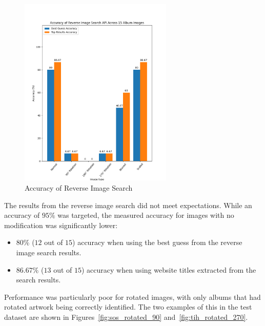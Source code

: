 \begin{figure} [H]
    \centering
    \includegraphics[width=0.65\textwidth]{figures/evaluation_graphs_ris.png}
    \caption{Accuracy of Reverse Image Search}
    \label{fig:album-scanning-results-ris}
\end{figure}

The results from the reverse image search did not meet expectations. While an accuracy of $95\%$ was targeted, the measured accuracy for images with no modification was significantly lower:
\begin{itemize}
    \item $80\%$ ($12$ out of $15$) accuracy when using the best guess from the reverse image search results.
    \item $86.67\%$ ($13$ out of $15$) accuracy when using website titles extracted from the search results.
\end{itemize}

Performance was particularly poor for rotated images, with only albums that had rotated artwork being correctly identified. The two examples of this in the test dataset are shown in Figures~\ref{fig:sos_rotated_90} and~\ref{fig:tih_rotated_270}.

